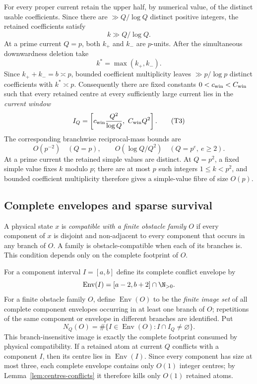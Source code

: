 For every proper current retain the upper half, by numerical value, of the
distinct usable coefficients.  Since there are $\gg Q/\log Q$ distinct
positive integers, the retained coefficients satisfy
\[
k\gg Q/\log Q.
\]
At a prime current $Q=p$, both $k_+$ and $k_-$ are $p$-units.  After the
simultaneous downwardness deletion take
\[
k^*=\max(k_+,k_-).
\]
Since $k_++k_-=b\asymp p$, bounded coefficient multiplicity leaves
$\gg p/\log p$ distinct coefficients with $k^*\asymp p$.
Consequently there are fixed constants $0<c_{\rm win}<C_{\rm win}$ such that
every retained centre at every sufficiently large current lies in the
\emph{current window}
\[
I_Q=
\left[c_{\rm win}\frac{Q^2}{\log Q},\ C_{\rm win}Q^2\right].
\tag{T3}\label{eq:tail-current-window}
\]
The corresponding branchwise reciprocal-mass bounds are
\[
O(p^{-2})\quad(Q=p),
\qquad
O(\log Q/Q^2)\quad(Q=p^e,\ e\ge2).
\tag{T4}\label{eq:raw-resource}
\]
At a prime current the retained simple values are distinct.  At $Q=p^2$, a
fixed simple value fixes $k$ modulo $p$; there are at most $p$ such integers
$1\le k<p^2$, and bounded coefficient multiplicity therefore gives a
simple-value fibre of size $O(p)$.

\subsection{Complete envelopes and sparse survival}

A physical state $x$ is \emph{compatible with a finite obstacle family $O$}
if every component of $x$ is disjoint and non-adjacent to every component that
occurs in any branch of $O$.  A family is obstacle-compatible when each of its
branches is.  This condition depends only on the complete footprint of $O$.

For a component interval $I=[a,b]$ define its complete conflict envelope by
\[
\operatorname{Env}(I)=[a-2,b+2]\cap\N_{>0}.
\]
For a finite obstacle family $O$, define $\operatorname{Env}(O)$ to be the
\emph{finite image set} of all complete component envelopes occurring in at
least one branch of $O$; repetitions of the same component or envelope in
different branches are identified.  Put
\[
N_Q(O)=
\#\{I\in\operatorname{Env}(O):I\cap I_Q\ne\varnothing\}.
\]
This branch-insensitive image is exactly the complete footprint consumed by
physical compatibility.  If a retained atom at current $Q$ conflicts with a
component $I$, then its centre lies in $\operatorname{Env}(I)$.  Since every
component has size at most three, each complete envelope contains only $O(1)$
integer centres; by Lemma~\ref{lem:centres-conflicts} it therefore kills only
$O(1)$ retained atoms.

